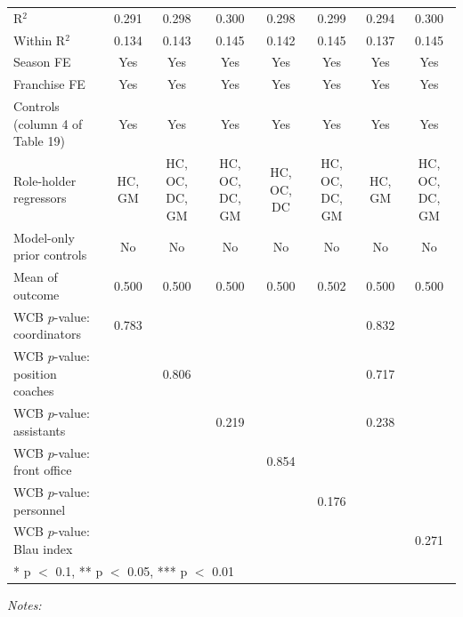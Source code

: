 \begin{table}[!h]
{\begin{threeparttable}
\begin{tabular}[t]{lccccccc}
R$^2$ & 0.291 & 0.298 & 0.300 & 0.298 & 0.299 & 0.294 & 0.300\\
Within R$^2$ & 0.134 & 0.143 & 0.145 & 0.142 & 0.145 & 0.137 & 0.145\\
Season FE & Yes & Yes & Yes & Yes & Yes & Yes & Yes\\
Franchise FE & Yes & Yes & Yes & Yes & Yes & Yes & Yes\\
Controls (column 4 of Table 19) & Yes & Yes & Yes & Yes & Yes & Yes & Yes\\
Role-holder regressors & HC, GM & HC, OC, DC, GM & HC, OC, DC, GM & HC, OC, DC & HC, OC, DC, GM & HC, GM & HC, OC, DC, GM\\
Model-only prior controls & No & No & No & No & No & No & No\\
Mean of outcome & 0.500 & 0.500 & 0.500 & 0.500 & 0.502 & 0.500 & 0.500\\
WCB $p$-value: coordinators & 0.783 &  &  &  &  & 0.832 & \\
WCB $p$-value: position coaches &  & 0.806 &  &  &  & 0.717 & \\
WCB $p$-value: assistants &  &  & 0.219 &  &  & 0.238 & \\
WCB $p$-value: front office &  &  &  & 0.854 &  &  & \\
WCB $p$-value: personnel &  &  &  &  & 0.176 &  & \\
WCB $p$-value: Blau index &  &  &  &  &  &  & 0.271\\
\bottomrule
\multicolumn{8}{l}{\rule{0pt}{1em}* p $<$ 0.1, ** p $<$ 0.05, *** p $<$ 0.01}\\
\end{tabular}
\begin{tablenotes}[para]
\item \textit{Notes:} 

\end{tablenotes}
\end{threeparttable}}
\end{table}
